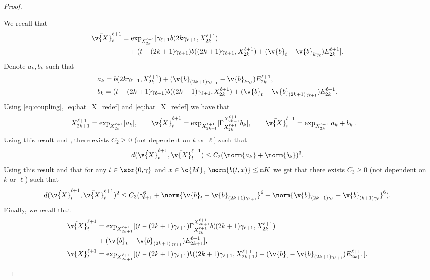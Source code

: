 \begin{proof}{}{}
\begin{enumerate}[wide, labelindent=0pt, label=(\alph*)]
\begin{equation}
		      \end{equation}
		      We recall that \begin{align} \bar{\v{X}}_{t}^{\ell+1} & = \exp_{X_{2k}^{\ell+1}}[\gamma_{\ell+1} b(2 k \gamma_{\ell + 1}, X_{2k}^{\ell+1}) \\  & \quad + (t - (2k+1) \gamma_{\ell+1}) b((2 k+1) \gamma_{\ell + 1}, X_{2k}^{\ell+1}) + (\v{b}_{t} - \v{b}_{k \gamma_\ell}) E_{2k}^{\ell+1} ] .
                 \label{eq:bar_X_redef}
		      \end{align}
		      Denote $a_k, b_k$ such that \begin{align}  & a_k = b(2 k \gamma_{\ell + 1}, X_{2k}^{\ell+1}) + (\v{b}_{(2k+1)\gamma_{\ell+1}} - \v{b}_{k \gamma_\ell}) E_{2k}^{\ell+1} , \\ &b_k = (t - (2k+1)\gamma_{\ell+1}) b((2k+1) \gamma_{\ell + 1}, X_{2k}^{\ell+1}) + (\v{b}_{t} - \v{b}_{(2k+1) \gamma_{\ell+1}}) E_{2k}^{\ell+1} .
		      \end{align}
		      Using \eqref{eq:coupling}, \eqref{eq:hat_X_redef} and \eqref{eq:bar_X_redef} we have that \begin{align}  & X_{2k+1}^{\ell+1} = \exp_{X_{2k}^{\ell+1}}[a_k] , \qquad \textstyle{\hat{\v{X}}_{t}^{\ell+1} = \exp_{X_{2k+1}^{\ell+1}}[\Gamma_{X_{2k}^{\ell+1}}^{X_{2k+1}^{\ell+1}}b_k] , \qquad \bar{\v{X}}_{t}^{\ell+1} = \exp_{X_{2k}^{\ell+1}}[a_k + b_k] .
              }
		      \end{align}
		      Using this result and \cite[Lemma 3]{sun2019escaping}, there exists $C_2 \geq 0$ (not dependent on $k$ or $\ell$) such that \begin{equation} d(\hat{\v{X}}_{t}^{\ell+1}, \bar{\v{X}}_{t}^{\ell+1}) \leq C_2 (\norm{a_k} + \norm{b_k})^3 .
		      \end{equation}
		      Using this result and that for any $t \in \sbr{0,\gamma}$ and $x \in \c{M}$, $\norm{b(t,x)} \leq \mathtt{m}{K}$ we get that there exists $C_3 \geq 0$ (not dependent on $k$ or $\ell$) such that \begin{equation} \label{eq:bound_distance_uno} d(\hat{\v{X}}_{t}^{\ell+1}, \bar{\v{X}}_{t}^{\ell+1})^2 \leq C_3 (\gamma_{\ell+1}^6 + \norm{\v{b}_{t} - \v{b}_{(2k+1) \gamma_{\ell+1}}}^6 + \norm{\v{b}_{(2k+1) \gamma_{\ell}} - \v{b}_{(k+1) \gamma_{\ell}}}^6) .
		      \end{equation}
		      Finally, we recall that \begin{align} \hat{\v{X}}_{t}^{\ell+1} & = \exp_{X_{2k+1}^{\ell+1}}[(t - (2k+1)\gamma_{\ell+1}) \Gamma_{X_{2k}^{\ell+1}}^{X_{2k+1}^{\ell+1}} b((2k+1)\gamma_{\ell+1}, X_{2k}^{\ell+1}) \\ \quad &+ (\v{b}_{t} - \v{b}_{(2k+1) \gamma_{\ell+1}}) E_{2k+1}^{\ell+1}] , \\ \v{X}_{t}^{\ell+1} &= \exp_{X_{2k+1}^{\ell+1}}[(t - (2k+1)\gamma_{\ell+1}) b((2k+1)\gamma_{\ell+1}, X_{2k+1}^{\ell+1}) + (\v{b}_{t} - \v{b}_{(2k+1) \gamma_{\ell+1}}) E_{2k+1}^{\ell+1}] .

\end{align}
\end{enumerate}
\end{proof}
